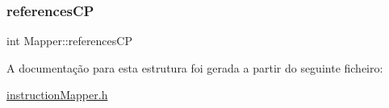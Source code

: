 \hypertarget{struct_mapper_af2d2cc85289235cb8ba33cb807404241}{}\label{struct_mapper_af2d2cc85289235cb8ba33cb807404241} 
\subsubsection{\texorpdfstring{references\+CP}{referencesCP}}
{\footnotesize\ttfamily int Mapper\+::references\+CP}



A documentação para esta estrutura foi gerada a partir do seguinte ficheiro\+:\begin{DoxyCompactItemize}
\item 
\hyperlink{instruction_mapper_8h}{instruction\+Mapper.\+h}\end{DoxyCompactItemize}
